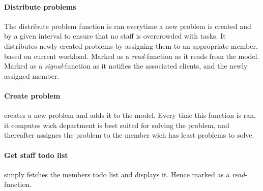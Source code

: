 \paragraph{Distribute problems} The distribute problem function is ran everytime a new problem is created and by a given interval to ensure that no staff is overcrowded with tasks. 
It distributes newly created problems by assigning them to an appropriate \astaff[] member, based on current workload. %
Marked as a \textit{read}-function as it reads from the model. Marked as a \textit{signal}-function as it notifies the associated clients, and the newly assigned \astaff[] member. 


\paragraph{Create problem} creates a new problem and adds it to the model. Every time this function is ran, it computes wich department is best suited for solving the problem, and thereafter assignes the problem to the \astaff[] member wich has least problems to solve.  


\paragraph{Get staff todo list} simply fetches the \astaff[] members todo list and displays it. Hence marked as a \textit{read}-function. 

